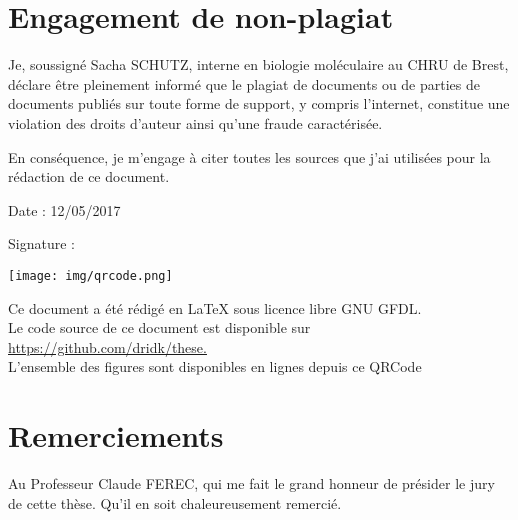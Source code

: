 \documentclass[12pt,a4paper]{article}
\begin{document}
\thispagestyle{empty}
\null
\newpage
\newpage
\thispagestyle{empty}
\setcounter{page}{0}
\thispagestyle{empty}
\section*{Engagement de non-plagiat}

Je, soussigné Sacha SCHUTZ, interne en biologie moléculaire au CHRU de Brest, déclare être pleinement informé que le plagiat de
documents ou de parties de documents publiés sur toute forme de
support, y compris l'internet, constitue une violation des droits
d'auteur ainsi qu'une fraude caractérisée.

En conséquence, je m'engage à citer toutes les sources que j'ai
utilisées pour la rédaction de ce document.

Date : 12/05/2017

\vspace{0.5cm}

Signature : \\
\vspace{0.5cm}



\vfill


\vspace{1cm}

\begin{center}
 \texttt{[image: img/qrcode.png]}\hfill

\vspace{1cm}

Ce document a été rédigé en \LaTeX{} sous licence libre GNU GFDL.\\ Le code source de ce document est disponible sur \url{https://github.com/dridk/these.} \\
L'ensemble des figures sont disponibles en lignes depuis ce QRCode
\end{center}



\newpage



\thispagestyle{empty}
\setcounter{page}{0}
\thispagestyle{empty}

\newpage

\section*{Remerciements}
Au Professeur Claude FEREC, qui me fait le grand honneur de présider le jury de cette thèse. Qu'il en soit chaleureusement remercié. \\
\end{document}
